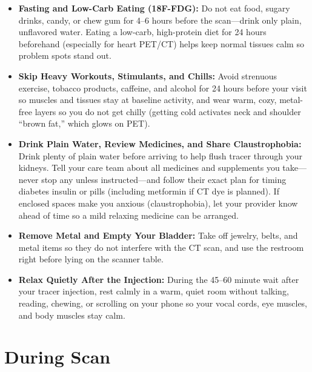 \begin{itemize}
    \item \textbf{Fasting and Low-Carb Eating (18F-FDG):} Do not eat food, sugary drinks, candy, or chew gum for 4--6 hours before the scan---drink only plain, unflavored water. Eating a low-carb, high-protein diet for 24 hours beforehand (especially for heart PET/CT) helps keep normal tissues calm so problem spots stand out.
    \item \textbf{Skip Heavy Workouts, Stimulants, and Chills:} Avoid strenuous exercise, tobacco products, caffeine, and alcohol for 24 hours before your visit so muscles and tissues stay at baseline activity, and wear warm, cozy, metal-free layers so you do not get chilly (getting cold activates neck and shoulder ``brown fat,'' which glows on PET).
    \item \textbf{Drink Plain Water, Review Medicines, and Share Claustrophobia:} Drink plenty of plain water before arriving to help flush tracer through your kidneys. Tell your care team about all medicines and supplements you take---never stop any unless instructed---and follow their exact plan for timing diabetes insulin or pills (including metformin if CT dye is planned). If enclosed spaces make you anxious (claustrophobia), let your provider know ahead of time so a mild relaxing medicine can be arranged.
    \item \textbf{Remove Metal and Empty Your Bladder:} Take off jewelry, belts, and metal items so they do not interfere with the CT scan, and use the restroom right before lying on the scanner table.
    \item \textbf{Relax Quietly After the Injection:} During the 45--60 minute wait after your tracer injection, rest calmly in a warm, quiet room without talking, reading, chewing, or scrolling on your phone so your vocal cords, eye muscles, and body muscles stay calm.
\end{itemize}

\section{During Scan}

